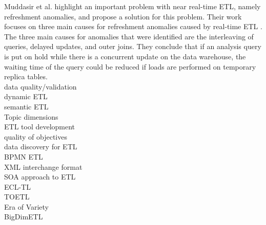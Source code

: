 \documentclass[11pt]{article}
\begin{document}
Muddasir et al. highlight an important problem with near real-time ETL, namely refreshment anomalies, and propose a solution for this problem. Their work focuses on three main causes for refreshment anomalies caused by real-time ETL \cite{MohammedMuddasir2020545}. The three main causes for anomalies that were identified are the interleaving of queries, delayed updates, and outer joins. They conclude that if an analysis query is put on hold while there is a concurrent update on the data warehouse, the waiting time of the query could be reduced if loads are performed on temporary replica tables. \\



data quality/validation \cite{Wrembel20223, Ali2020, Sreemathy20191183, Amuthabala2019233} \\
dynamic ETL \cite{BadiuzzamanBiplob2022243} \\
semantic ETL \cite{DebNath202185} \\
Topic dimensions \cite{Walha2019203, Walha2021374} \\
ETL tool development \cite{Wang2020} \\
quality of objectives \cite{Saebao2020539} \\
data discovery for ETL \cite{Madhikerrni2019174} \\
BPMN ETL \cite{Awiti2019299} \\
XML interchange format \cite{Awiti2019427} \\
SOA approach to ETL \cite{Oliveira2019204} \\
ECL-TL \cite{Pan2018275} \\
TOETL \cite{Teixeira2018225} \\
Era of Variety \cite{Berkani201898} \\
BigDimETL \cite{Mallek2018798}
\end{document}

